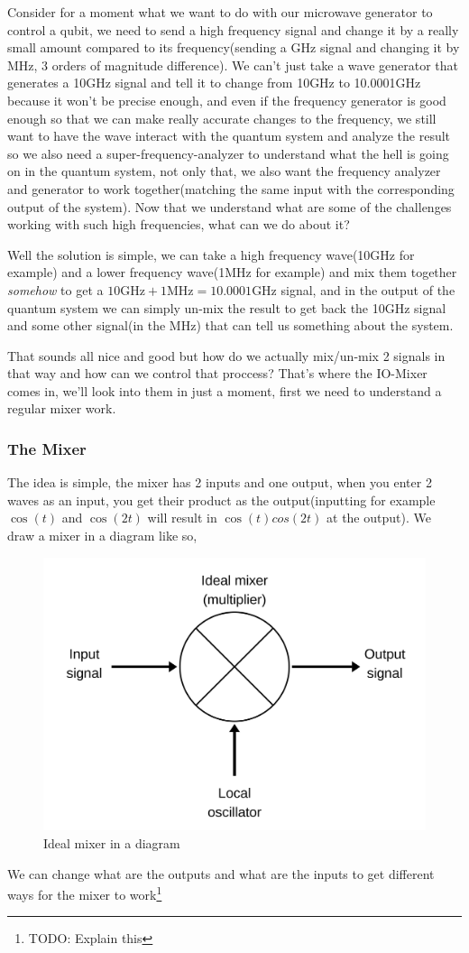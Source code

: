 \documentclass[english, a4paper, 12pt, twoside]{article}
\numberwithin{equation}{section} %
\begin{document}
Consider for a moment what we want to do with our microwave generator to control a qubit, we need to send a high frequency signal and change it by a really small amount compared to its frequency(sending a GHz signal and changing it by MHz, 3 orders of magnitude difference). We can't just take a wave generator that generates a 10GHz signal and tell it to change from 10GHz to 10.0001GHz because it won't be precise enough, and even if the frequency generator is good enough so that we can make really accurate changes to the frequency, we still want to have the wave interact with the quantum system and analyze the result so we also need a super-frequency-analyzer to understand what the hell is going on in the quantum system, not only that, we also want the frequency analyzer and generator to work together(matching the same input with the corresponding output of the system). Now that we understand what are some of the challenges working with such high frequencies, what can we do about it?

Well the solution is simple, we can take a high frequency wave(10GHz for example) and a lower frequency wave(1MHz for example) and mix them together \textit{somehow} to get a $10\text{GHz} + 1\text{MHz} = 10.0001\text{GHz}$ signal, and in the output of the quantum system we can simply un-mix the result to get back the 10GHz signal and some other signal(in the MHz) that can tell us something about the system.

That sounds all nice and good but how do we actually mix/un-mix 2 signals in that way and how can we control that proccess? That's where the IO-Mixer comes in, we'll look into them in just a moment, first we need to understand a regular mixer work.

\subsubsection{The Mixer}
The idea is simple, the mixer has 2 inputs and one output, when you enter 2 waves as an input, you get their product as the output(inputting for example $\cos(t)$ and $\cos(2t)$ will result in $\cos(t)cos(2t)$ at the output). %
We draw a mixer in a diagram like so,

\begin{figure}[H]
    \centering
    \includegraphics[width=0.3\columnwidth]{Ideal-Mixer.png} %
    \caption{Ideal mixer in a diagram}
    \label{fig:Ideal-Mixer}
\end{figure}
We can change what are the outputs and what are the inputs to get different ways for the mixer to work\footnote{TODO: Explain this} %
\end{document}
